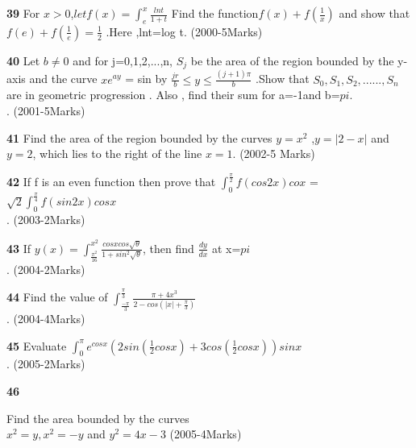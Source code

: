 \documentclass[journal,12pt,twocolumn]{IEEEtran}
\theoremstyle{remark}
\begin{document}
														    \textbf{39}
														    For $x > 0 $,$
														    let f(x)=\int_{e}^{x}\frac{lnt}{1+t}$
														    Find the function$ f(x) + f(\frac{1}{x})$
														    and show that $f(e)+f(\frac{1}{e})=
														    \frac{1}{2}$ .Here ,lnt=log t.
														      \hfill{(2000-5Marks)}
														        

															  \textbf{40}
															    Let $b\neq0$ and for j=0,1,2,...,n, $S_j$ be the area of the region bounded by the y-axis and the curve $xe^{ay}$ = sin by $\frac{jr}{b} \le y \le \frac{(j+1)\pi}{b}$ .Show that  $S_0,S_1,S_2,......,S_n$ are in geometric progression . Also , find their sum for a=-1and b=$pi$.\\.
															      \hfill{(2001-5Marks)}
															        
																  \textbf{41}
																    Find the area of the region bounded by the curves $y=x^2$ ,$y=|2-x|$ and $y=2$, which lies to the right of the line $x=1$.
																      \hfill{(2002-5 Marks) }

																        \textbf{42}
																	  If f is an even function then prove that 
																	    $\int_{0}^{\frac{\pi}{2}}f(cos2x)cox $ =$\sqrt{2}\int_{0}^{\frac{\pi}{4}}f(sin2x)cosx$\\.
																	      \hfill{(2003-2Marks)}
																	        
																		   \textbf{43}
																		      If $y(x)=\int_{\frac{\pi^2}{16}}^{x^2}\frac{cosxcos\sqrt{\theta}}{1+sin^2\sqrt{\theta}}$, then find $\frac{dy}{dx}$ at x=$pi$\\.
																		         \hfill{(2004-2Marks)}

																			    \textbf{44}
																			       Find the value of $\int_{\frac{-\pi}{3}}^{\frac{\pi}{3}}\frac{\pi+4x^3}{2-cos(|x|+\frac{\pi}{3})}$\\.
																			          \hfill{(2004-4Marks)}

																				     \textbf{45}
																				        Evaluate $\int_{0}^{\pi}e^{cosx}(2sin(\frac{1}{2}cosx)+3cos(\frac{1}{2}cosx))sinx$\\.
																					   \hfill{(2005-2Marks)}

																					      \textbf{46}
																					         
																						    Find the area bounded by the curves \\  
																						       $x^2=y,x^2=-y$ and $y^2=4x-3$
																						          \hfill{(2005-4Marks)}
																							     
\end{document}
